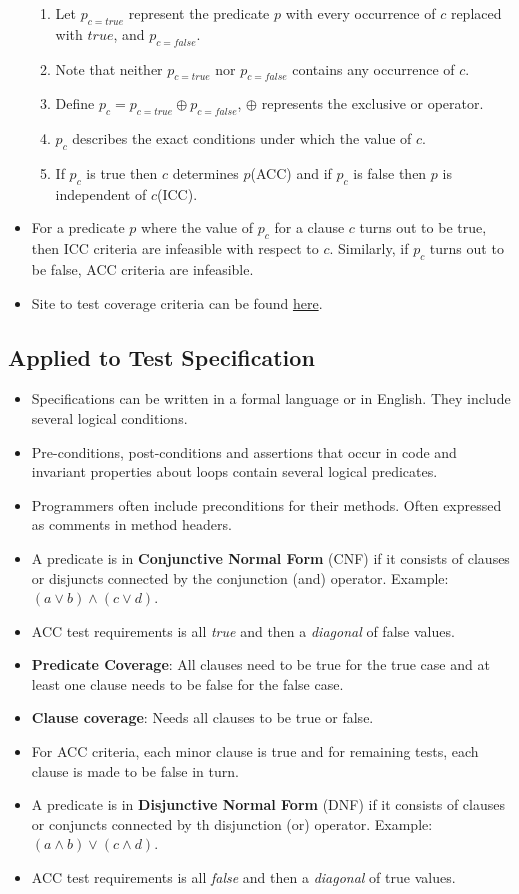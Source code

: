 \documentclass[a4paper]{article}
\begin{document}
\begin{itemize}
\begin{enumerate}
        \item Let $p_{c=true}$ represent the predicate $p$ with every occurrence of $c$ replaced with $true$, and $p_{c=false}$.
        \item Note that neither $p_{c=true}$ nor $p_{c=false}$ contains any occurrence of $c$.
        \item Define $p_c=p_{c=true}\oplus p_{c=false}$, $\oplus$ represents the exclusive or operator.
        \item $p_c$ describes the exact conditions under which the value of $c$.
        \item If $p_c$ is true then $c$ determines $p$(ACC) and if $p_c$ is false then $p$ is independent of $c$(ICC).
    \end{enumerate}
    \item For a predicate $p$ where the value of $p_c$ for a clause $c$ turns out to be true, then ICC criteria are infeasible with respect to $c$. Similarly, if $p_c$ turns out to be false, ACC criteria are infeasible.
    \item Site to test coverage criteria can be found \href{https://cs.gmu.edu:8443/offutt/coverage/LogicCoverage}{here}.
\end{itemize}

\subsection{Applied to Test Specification}
\begin{itemize}
    \item Specifications can be written in a formal language or in English. They include several logical conditions.
    \item Pre-conditions, post-conditions and assertions that occur in code and invariant properties about loops contain several logical predicates.
    \item Programmers often include preconditions for their methods. Often expressed as comments in method headers.
    \item A predicate is in \textbf{Conjunctive Normal Form} (CNF) if it consists of clauses or disjuncts connected by the conjunction (and) operator. Example: $(a\lor b)\land(c\lor d)$.
    \item ACC test requirements is all \textit{true} and then a \textit{diagonal} of false values.
    \item \textbf{Predicate Coverage}: All clauses need to be true for the true case and at least one clause needs to be false for the false case. 
    \item \textbf{Clause coverage}: Needs all clauses to be true or false.
    \item For ACC criteria, each minor clause is true and for remaining tests, each clause is made to be false in turn.
    \item A predicate is in \textbf{Disjunctive Normal Form} (DNF) if it consists of clauses or conjuncts connected by th disjunction (or) operator. Example: $(a\land b)\lor(c\land d)$.
    \item ACC test requirements is all \textit{false} and then a \textit{diagonal} of true values.
\end{itemize}
\end{document}
